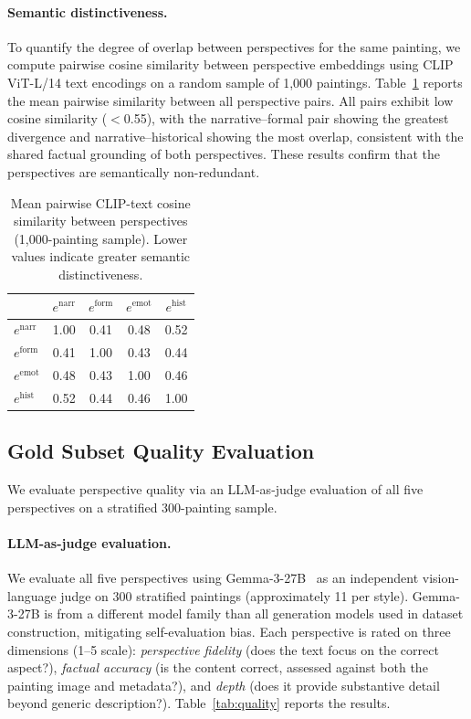 \paragraph{Semantic distinctiveness.}
To quantify the degree of overlap between perspectives for the same painting, we compute pairwise cosine similarity between perspective embeddings using CLIP ViT-L/14 text encodings on a random sample of 1,000 paintings.
Table~\ref{tab:pairwise_sim} reports the mean pairwise similarity between all perspective pairs.
All pairs exhibit low cosine similarity ($<$0.55), with the narrative--formal pair showing the greatest divergence and narrative--historical showing the most overlap, consistent with the shared factual grounding of both perspectives.
These results confirm that the perspectives are semantically non-redundant.

\begin{table}[h]
\centering
\caption{Mean pairwise CLIP-text cosine similarity between perspectives (1{,}000-painting sample). Lower values indicate greater semantic distinctiveness.}
\label{tab:pairwise_sim}
\begin{tabular}{lcccc}
\toprule
 & $e^{\text{narr}}$ & $e^{\text{form}}$ & $e^{\text{emot}}$ & $e^{\text{hist}}$ \\
\midrule
$e^{\text{narr}}$ & 1.00 & 0.41 & 0.48 & 0.52 \\
$e^{\text{form}}$ & 0.41 & 1.00 & 0.43 & 0.44 \\
$e^{\text{emot}}$ & 0.48 & 0.43 & 1.00 & 0.46 \\
$e^{\text{hist}}$ & 0.52 & 0.44 & 0.46 & 1.00 \\
\bottomrule
\end{tabular}
\end{table}

\subsection{Gold Subset Quality Evaluation}
\label{sec:quality}

We evaluate perspective quality via an LLM-as-judge evaluation of all five perspectives on a stratified 300-painting sample.

\paragraph{LLM-as-judge evaluation.}
We evaluate all five perspectives using Gemma-3-27B~\cite{gemma3} as an independent vision-language judge on 300 stratified paintings (approximately 11 per style).
Gemma-3-27B is from a different model family than all generation models used in dataset construction, mitigating self-evaluation bias.
Each perspective is rated on three dimensions (1--5 scale): \textit{perspective fidelity} (does the text focus on the correct aspect?), \textit{factual accuracy} (is the content correct, assessed against both the painting image and metadata?), and \textit{depth} (does it provide substantive detail beyond generic description?).
Table~\ref{tab:quality} reports the results.

